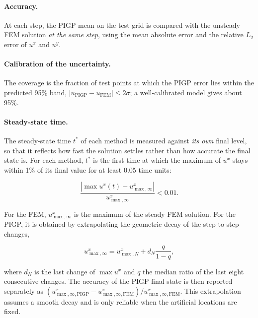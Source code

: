 \documentclass[11pt, a4paper]{report}
\begin{document}
\paragraph{Accuracy.}
At each step, the PIGP mean on the test grid is compared with the unsteady FEM solution \emph{at the same step},
using the mean absolute error and the relative \(L_2\) error of \(u^x\) and \(u^y\).
 
\paragraph{Calibration of the uncertainty.}
The coverage is the fraction of test points at which the PIGP error lies within the predicted 95\% band,
\(|u_{\mathrm{PIGP}} - u_{\mathrm{FEM}}| \le 2\sigma\); a well-calibrated model gives about 95\%.
 
\paragraph{Steady-state time.}
The steady-state time \(t^\ast\) of each method is measured against \emph{its own} final level, so that it reflects
how fast the solution settles rather than how accurate the final state is. For each method, \(t^\ast\) is the first
time at which the maximum of \(u^x\) stays within 1\% of its final value for at least 0.05 time units:
 
\begin{equation}
    \frac{\left|\max u^x(t) - u^x_{\max,\infty}\right|}{u^x_{\max,\infty}} < 0.01 .
    \label{eq:steady-criterion}
\end{equation}
 
\noindent For the FEM, \(u^x_{\max,\infty}\) is the maximum of the steady FEM solution. For the PIGP, it is obtained by
extrapolating the geometric decay of the step-to-step changes,
 
\begin{equation}
    u^x_{\max,\infty} = u^x_{\max,N} + d_N \frac{q}{1-q},
\end{equation}
 
\noindent where \(d_N\) is the last change of \(\max u^x\) and \(q\) the median ratio of the last eight consecutive changes.
The accuracy of the PIGP final state is then reported separately as
\((u^x_{\max,\infty,\mathrm{PIGP}} - u^x_{\max,\infty,\mathrm{FEM}})/u^x_{\max,\infty,\mathrm{FEM}}\).
This extrapolation assumes a smooth decay and is only reliable when the artificial locations are fixed.
 
\pagebreak
\end{document}
